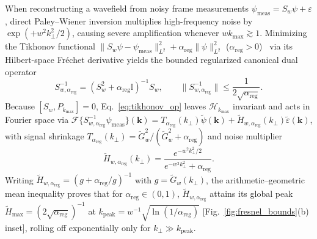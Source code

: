 \documentclass{optica-article}
\newcommand{\norm}[1]{\lVert #1 \rVert}
\begin{document}
When reconstructing a wavefield from noisy frame measurements $\psi_{\mathrm{meas}} = S_w\psi + \varepsilon$, direct Paley--Wiener inversion multiplies high-frequency noise by $\exp(+w^2 k_\perp^2/2)$, causing severe amplification whenever $w k_{\max} \gtrsim 1$. Minimizing the Tikhonov functional $\norm{S_w\psi - \psi_{\mathrm{meas}}}_{L^2}^2 + \alpha_{\mathrm{reg}}\norm{\psi}_{L^2}^2$ ($\alpha_{\mathrm{reg}} > 0$)~\cite{Engl1996} via its Hilbert-space Fr\'echet derivative yields the bounded regularized canonical dual operator
\begin{equation}
  S_{w,\alpha_{\mathrm{reg}}}^{-1} = \left(S_w^2 + \alpha_{\mathrm{reg}}\mathbb{I}\right)^{-1} S_w, \qquad \norm{S_{w,\alpha_{\mathrm{reg}}}^{-1}} \le \frac{1}{2\sqrt{\alpha_{\mathrm{reg}}}}.
  \label{eq:tikhonov_op}
\end{equation}
Because $[S_w, P_{k_{\max}}] = 0$, Eq.~\eqref{eq:tikhonov_op} leaves $\mathcal{H}_{k_{\max}}$ invariant and acts in Fourier space via $\mathcal{F}\{S_{w,\alpha_{\mathrm{reg}}}^{-1}\psi_{\mathrm{meas}}\}(\mathbf{k}) = T_{\alpha_{\mathrm{reg}}}(k_\perp)\widetilde{\psi}(\mathbf{k}) + \widetilde{H}_{w,\alpha_{\mathrm{reg}}}(k_\perp)\widetilde{\varepsilon}(\mathbf{k})$, with signal shrinkage $T_{\alpha_{\mathrm{reg}}}(k_\perp) = \widetilde{G}_w^2/(\widetilde{G}_w^2 + \alpha_{\mathrm{reg}})$ and noise multiplier
\begin{equation}
  \widetilde{H}_{w,\alpha_{\mathrm{reg}}}(k_\perp) = \frac{e^{-w^2 k_\perp^2/2}}{e^{-w^2 k_\perp^2} + \alpha_{\mathrm{reg}}}.
  \label{eq:noise_mult}
\end{equation}
Writing $\widetilde{H}_{w,\alpha_{\mathrm{reg}}} = (g + \alpha_{\mathrm{reg}}/g)^{-1}$ with $g = \widetilde{G}_w(k_\perp)$, the arithmetic--geometric mean inequality proves that for $\alpha_{\mathrm{reg}} \in (0,1)$, $\widetilde{H}_{w,\alpha_{\mathrm{reg}}}$ attains its global peak $\widetilde{H}_{\max} = (2\sqrt{\alpha_{\mathrm{reg}}})^{-1}$ at $k_{\mathrm{peak}} = w^{-1}\sqrt{\ln(1/\alpha_{\mathrm{reg}})}$ [Fig.~\ref{fig:fresnel_bounds}(b) inset], rolling off exponentially only for $k_\perp \gg k_{\mathrm{peak}}$.
\end{document}
